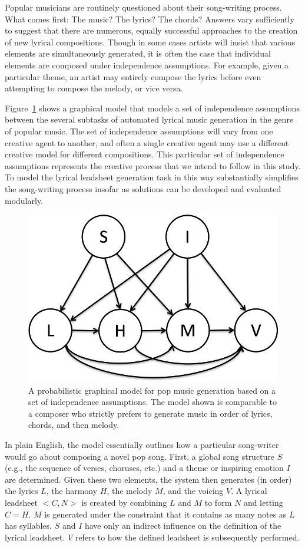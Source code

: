 \documentclass[11pt,phd]{byuprop}
\begin{document}
Popular musicians are routinely questioned about their song-writing process. What comes first: The music? The lyrics? The chords? Answers vary sufficiently to suggest that there are numerous, equally successful approaches to the creation of new lyrical compositions. Though in some cases artists will insist that various elements are simultaneously generated, it is often the case that individual elements are composed under independence assumptions. For example, given a particular theme, an artist may entirely compose the lyrics before even attempting to compose the melody, or vice versa. 

Figure~\ref{fig:graphical_model} shows a graphical model that models a set of independence assumptions between the several subtasks of automated lyrical music generation in the genre of popular music. The set of independence assumptions will vary from one creative agent to another, and often a single creative agent may use a different creative model for different compositions. This particular set of independence assumptions represents the creative process that we intend to follow in this study. To model the lyrical leadsheet generation task in this way substantially simplifies the song-writing process insofar as solutions can be developed and evaluated modularly.

\begin{figure}
  \centering
  \includegraphics[width=.35\textwidth]{graphics/graphical_model.jpg}
  \caption{A probabilistic graphical model for pop music generation based on a set of independence assumptions. The model shown is comparable to a composer who strictly prefers to generate music in order of lyrics, chords, and then melody.}
    \label{fig:graphical_model}
\end{figure}

In plain English, the model essentially outlines how a particular song-writer would go about composing a novel pop song. First, a global song structure $S$ (e.g., the sequence of verses, choruses, etc.) and a theme or inspiring emotion $I$ are determined. Given these two elements, the system then generates (in order) the lyrics $L$, the harmony $H$, the melody $M$, and the voicing $V$. A lyrical leadsheet $<C,N>$ is created by combining $L$ and $M$ to form $N$ and letting $C = H$. $M$ is generated under the constraint that it contains as many notes as $L$ has syllables. $S$ and $I$ have only an indirect influence on the definition of the lyrical leadsheet. $V$ refers to how the defined leadsheet is subsequently performed.
\end{document}
